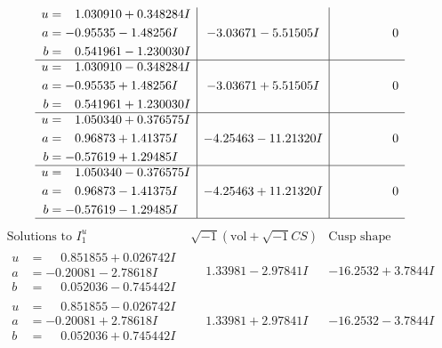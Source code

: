 \documentclass[1p]{elsarticle_modified}
\theoremstyle{definition}
\newcommand{\I}{\sqrt{-1}}
\begin{document}
$$\begin{array}{c|c|c}
\begin{aligned}
u &= \phantom{-}1.030910 + 0.348284 I \\
a &= -0.95535 - 1.48256 I \\
b &= \phantom{-}0.541961 - 1.230030 I\end{aligned}
 & -3.03671 - 5.51505 I & \phantom{-0.000000 } 0 \\ \hline\begin{aligned}
u &= \phantom{-}1.030910 - 0.348284 I \\
a &= -0.95535 + 1.48256 I \\
b &= \phantom{-}0.541961 + 1.230030 I\end{aligned}
 & -3.03671 + 5.51505 I & \phantom{-0.000000 } 0 \\ \hline\begin{aligned}
u &= \phantom{-}1.050340 + 0.376575 I \\
a &= \phantom{-}0.96873 + 1.41375 I \\
b &= -0.57619 + 1.29485 I\end{aligned}
 & -4.25463 - 11.21320 I & \phantom{-0.000000 } 0 \\ \hline\begin{aligned}
u &= \phantom{-}1.050340 - 0.376575 I \\
a &= \phantom{-}0.96873 - 1.41375 I \\
b &= -0.57619 - 1.29485 I\end{aligned}
 & -4.25463 + 11.21320 I & \phantom{-0.000000 } 0\\
 \hline 
 \end{array}$$\newpage$$\begin{array}{c|c|c}  
\text{Solutions to }I^u_{1}& \I (\text{vol} + \sqrt{-1}CS) & \text{Cusp shape}\\
 \hline 
\begin{aligned}
u &= \phantom{-}0.851855 + 0.026742 I \\
a &= -0.20081 - 2.78618 I \\
b &= \phantom{-}0.052036 - 0.745442 I\end{aligned}
 & \phantom{-}1.33981 - 2.97841 I & -16.2532 + 3.7844 I \\ \hline\begin{aligned}
u &= \phantom{-}0.851855 - 0.026742 I \\
a &= -0.20081 + 2.78618 I \\
b &= \phantom{-}0.052036 + 0.745442 I\end{aligned}
 & \phantom{-}1.33981 + 2.97841 I & -16.2532 - 3.7844 I \\ \hline\begin{aligned}

\end{aligned}
\end{array}$$
\end{document}
